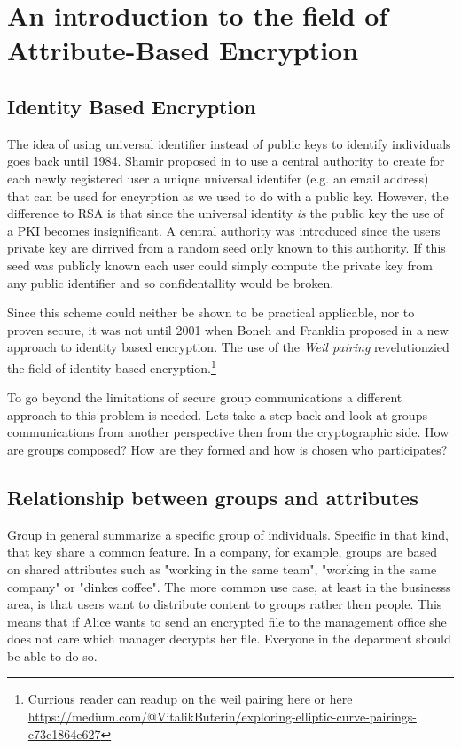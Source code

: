 \section{An introduction to the field of Attribute-Based Encryption}


\subsection{Identity Based Encryption}
The idea of using universal identifier instead of public keys to identify individuals goes back until 1984. Shamir proposed in \cite{shamir1984identity} to use a central authority to create for each newly registered user a unique universal identifer (e.g. an email address) that can be used for encyrption as we used to do with a public key. However, the difference to RSA is that since the universal identity \textit{is} the public key the use of a PKI becomes insignificant. A central authority was introduced since the users private key are dirrived from a random seed only known to this authority. If this seed was publicly known each user could simply compute the private key from any public identifier and so confidentallity would be broken. 

Since this scheme could neither be shown to be practical applicable, nor to proven secure, it was not until 2001 when Boneh and Franklin proposed in \cite{boneh2001identity} a new approach to identity based encryption. The use of the \textit{Weil pairing} revelutionzied the field of identity based encryption.\footnote{Currious reader can readup on the weil pairing here \cite{Miller2004} \cite{galbraith2008pairings} or here \url{https://medium.com/@VitalikButerin/exploring-elliptic-curve-pairings-c73c1864e627}}



To go beyond the limitations of secure group communications a different approach to this problem is needed. Lets take a step back and look at groups communications from another perspective then from the cryptographic side. How are groups composed? How are they formed and how is chosen who participates? 

\subsection{Relationship between groups and attributes}
Group in general summarize a specific group of individuals. Specific in that kind, that key share a common feature. In a company, for example, groups are based on shared attributes such as "working in the same team", "working in the same company" or "dinkes coffee". The more common use case, at least in the businesss area, is that users want to distribute content to groups rather then people. This means that if Alice wants to send an encrypted file to the management office she does not care which manager decrypts her file. Everyone in the deparment should be able to do so. 

